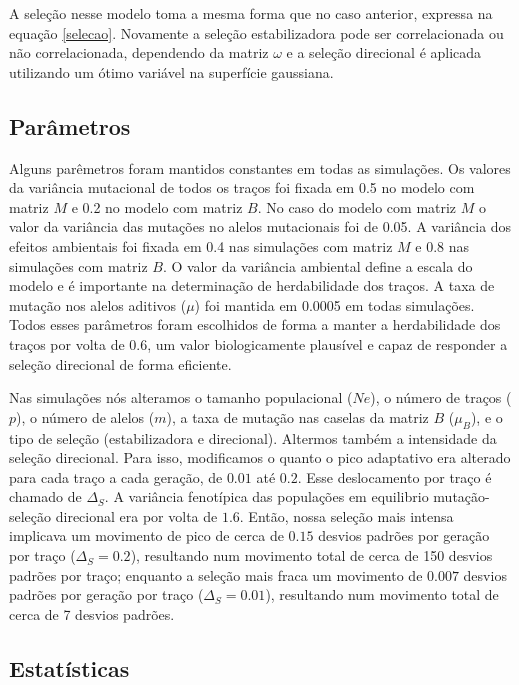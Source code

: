 A seleção nesse modelo toma a mesma forma que no caso anterior, expressa
na equação \ref{selecao}.
Novamente a seleção estabilizadora pode ser correlacionada ou não
correlacionada, dependendo da matriz $\omega$ e a seleção direcional é
aplicada utilizando um ótimo variável na superfície gaussiana.

\subsection{Parâmetros}

Alguns parêmetros foram mantidos constantes em todas as simulações.
Os valores da variância mutacional de todos os traços foi fixada em 0.5
no modelo com matriz $M$ e 0.2 no modelo com matriz $B$.
No caso do modelo com matriz $M$ o valor da variância das mutações no
alelos mutacionais foi de 0.05.
A variância dos efeitos ambientais foi fixada em 0.4 nas simulações com
matriz $M$ e 0.8 nas simulações com matriz $B$.
O valor da variância ambiental define a escala do modelo e é importante
na determinação de herdabilidade dos traços.
A taxa de mutação nos alelos aditivos ($\mu$) foi mantida em 0.0005 em
todas simulações.
Todos esses parâmetros foram escolhidos de forma a manter a
herdabilidade dos traços por volta de 0.6, um valor biologicamente
plausível e capaz de responder a seleção direcional de forma eficiente.

Nas simulações nós alteramos o tamanho populacional ($Ne$), o número de
traços ($p$), o número de alelos ($m$), a taxa de mutação nas caselas da
matriz $B$ ($\mu_B$), e o tipo de seleção (estabilizadora e direcional).
Altermos também a intensidade da seleção direcional.
Para isso, modificamos o quanto o pico adaptativo era alterado para cada
traço a cada geração, de $0.01$ até $0.2$.
Esse deslocamento por traço é chamado de $\Delta_S$.
A variância fenotípica das populações em equilibrio mutação-seleção
direcional era por volta de $1.6$.
Então, nossa seleção mais intensa implicava um movimento de pico de
cerca de $0.15$ desvios padrões por geração por traço ($\Delta_S=0.2$),
resultando num movimento total de cerca de 150 desvios padrões por
traço; enquanto a seleção mais fraca um movimento de $0.007$ desvios
padrões por geração por traço ($\Delta_S=0.01$), resultando num
movimento total de cerca de 7 desvios padrões.

\subsection{Estatísticas}

